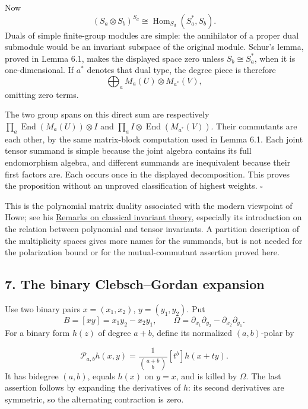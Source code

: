 \documentclass[
]{article}
\begin{document}
Now \[
(S_a\otimes S_b)^{S_d}
\cong\operatorname{Hom}_{S_d}(S_a^*,S_b).
\] Duals of simple finite-group modules are simple: the annihilator of a
proper dual submodule would be an invariant subspace of the original
module. Schur's lemma, proved in Lemma 6.1, makes the displayed space
zero unless \(S_b\cong S_a^*\), when it is one-dimensional. If \(a^*\)
denotes that dual type, the degree piece is therefore \[
\bigoplus_a M_a(U)\otimes M_{a^*}(V),
\] omitting zero terms.

The two group spans on this direct sum are respectively
\(\prod_a\operatorname{End}(M_a(U))\otimes I\) and
\(\prod_a I\otimes\operatorname{End}(M_{a^*}(V))\). Their commutants are
each other, by the same matrix-block computation used in Lemma 6.1. Each
joint tensor summand is simple because the joint algebra contains its
full endomorphism algebra, and different summands are inequivalent
because their first factors are. Each occurs once in the displayed
decomposition. This proves the proposition without an unproved
classification of highest weights. \(\square\)

This is the polynomial matrix duality associated with the modern
viewpoint of Howe; see his
\href{https://www.math.utah.edu/~ptrapa/math-library/howe/howe-remarks-invariant-theory-TAMS-1989.pdf}{Remarks
on classical invariant theory}, especially its introduction on the
relation between polynomial and tensor invariants. A partition
description of the multiplicity spaces gives more names for the
summands, but is not needed for the polarization bound or for the
mutual-commutant assertion proved here.

\subsection{7. The binary Clebsch--Gordan expansion}\label{section-7}

Use two binary pairs \(x=(x_1,x_2)\), \(y=(y_1,y_2)\). Put \[
B=[xy]=x_1y_2-x_2y_1,\qquad
\Omega=\partial_{x_1}\partial_{y_2}
-\partial_{x_2}\partial_{y_1}.
\] For a binary form \(h(z)\) of degree \(a+b\), define its normalized
\((a,b)\)-polar by \protect{}\label{equation-P11}{}

\[
\mathcal P_{a,b}h(x,y)
=\frac1{\binom{a+b}{b}}[t^b]h(x+ty).
\tag{P11}
\] It has bidegree \((a,b)\), equals \(h(x)\) on \(y=x\), and is killed
by \(\Omega\). The last assertion follows by expanding the derivatives
of \(h\): its second derivatives are symmetric, so the alternating
contraction is zero.
\end{document}
